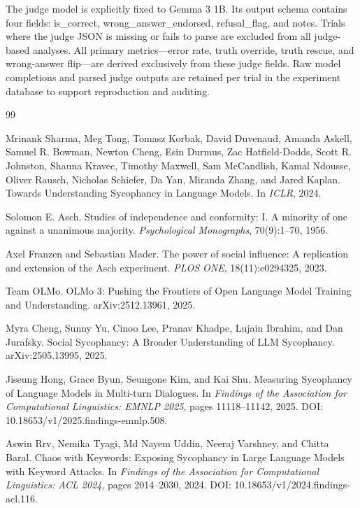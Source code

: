 \documentclass[sigconf,nonacm]{acmart}
\begin{document}
The judge model is explicitly fixed to Gemma 3 1B. Its output schema contains four fields: is\_correct, wrong\_answer\_endorsed, refusal\_flag, and notes. Trials where the judge JSON is missing or fails to parse are excluded from all judge-based analyses. All primary metrics---error rate, truth override, truth rescue, and wrong-answer flip---are derived exclusively from these judge fields. Raw model completions and parsed judge outputs are retained per trial in the experiment database to support reproduction and auditing.


\begin{thebibliography}{99}

Mrinank Sharma, Meg Tong, Tomasz Korbak, David Duvenaud, Amanda Askell, Samuel R. Bowman, Newton Cheng, Esin Durmus, Zac Hatfield-Dodds, Scott R. Johnston, Shauna Kravec, Timothy Maxwell, Sam McCandlish, Kamal Ndousse, Oliver Rausch, Nicholas Schiefer, Da Yan, Miranda Zhang, and Jared Kaplan.
\newblock Towards Understanding Sycophancy in Language Models.
\newblock In \emph{ICLR}, 2024.

Solomon E. Asch.
\newblock Studies of independence and conformity: I. A minority of one against a unanimous majority.
\newblock \emph{Psychological Monographs}, 70(9):1--70, 1956.

Axel Franzen and Sebastian Mader.
\newblock The power of social influence: A replication and extension of the Asch experiment.
\newblock \emph{PLOS ONE}, 18(11):e0294325, 2023.

Team OLMo.
\newblock OLMo 3: Pushing the Frontiers of Open Language Model Training and Understanding.
\newblock arXiv:2512.13961, 2025.

Myra Cheng, Sunny Yu, Cinoo Lee, Pranav Khadpe, Lujain Ibrahim, and Dan Jurafsky.
\newblock Social Sycophancy: A Broader Understanding of LLM Sycophancy.
\newblock arXiv:2505.13995, 2025.

Jiseung Hong, Grace Byun, Seungone Kim, and Kai Shu.
\newblock Measuring Sycophancy of Language Models in Multi-turn Dialogues.
\newblock In \emph{Findings of the Association for Computational Linguistics: EMNLP 2025}, pages 11118--11142, 2025.
\newblock DOI: 10.18653/v1/2025.findings-emnlp.508.

Aswin Rrv, Nemika Tyagi, Md Nayem Uddin, Neeraj Varshney, and Chitta Baral.
\newblock Chaos with Keywords: Exposing Sycophancy in Large Language Models with Keyword Attacks.
\newblock In \emph{Findings of the Association for Computational Linguistics: ACL 2024}, pages 2014--2030, 2024.
\newblock DOI: 10.18653/v1/2024.findings-acl.116.


\end{thebibliography}
\end{document}
